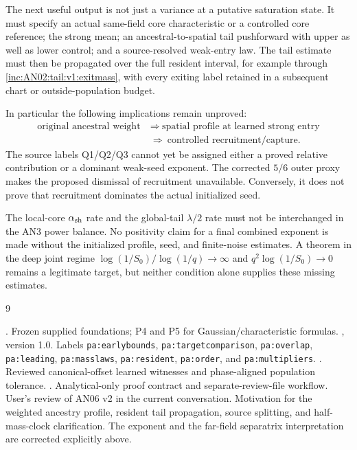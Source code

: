 \documentclass[11pt]{article}
\numberwithin{equation}{section}
\theoremstyle{remark}\newtheorem{remark}[theorem]{Remark}
\newcommand{\1}{\mathbf 1}
\begin{document}
The next useful output is not just a variance at a putative saturation
state. It must specify an actual same-field core characteristic or a
controlled core reference; the strong mean; an ancestral-to-spatial tail
pushforward with upper as well as lower control; and a source-resolved
weak-entry law. The tail estimate must then be propagated over the full
resident interval, for example through
\eqref{inc:AN02:tail:v1:exitmass}, with every exiting label retained in a
subsequent chart or outside-population budget.

In particular the following implications remain unproved:
\[
 \begin{aligned}
 \text{original ancestral weight}
 &\ \Longrightarrow\ \text{spatial profile at learned strong entry}\\
 &\ \Longrightarrow\ \text{controlled recruitment/capture}.
 \end{aligned}
\]
The source labels Q1/Q2/Q3 cannot yet be assigned either a proved relative
contribution or a dominant weak-seed exponent. The corrected $5/6$ outer
proxy makes the proposed dismissal of recruitment unavailable. Conversely,
it does not prove that recruitment dominates the actual initialized seed.

The local-core $\alpha_{\rm sh}$ rate and the global-tail $\lambda/2$
rate must not be interchanged in the AN3 power balance. No positivity claim
for a final combined exponent is made without the initialized profile,
seed, and finite-noise estimates. A theorem in the deep joint regime
$\log(1/S_0)/\log(1/q)\to\infty$ and
$q^2\log(1/S_0)\to0$ remains a legitimate target, but neither condition
alone supplies these missing estimates.

\begin{thebibliography}{9}
\raggedright
{} .
Frozen supplied foundations; P4 and P5 for Gaussian/characteristic formulas.
 , version 1.0.
Labels \texttt{pa:earlybounds}, \texttt{pa:targetcomparison},
\texttt{pa:overlap}, \texttt{pa:leading}, \texttt{pa:masslaws},
\texttt{pa:resident}, \texttt{pa:order}, and \texttt{pa:multipliers}.
 .
Reviewed canonical-offset learned witnesses and phase-aligned population tolerance.
 .
Analytical-only proof contract and separate-review-file workflow.
 User's review of AN06 v2 in the current conversation.
Motivation for the weighted ancestry profile, resident tail propagation,
source splitting, and half-mass-clock clarification. The exponent and the
far-field separatrix interpretation are corrected explicitly above.
\end{thebibliography}
\end{document}
